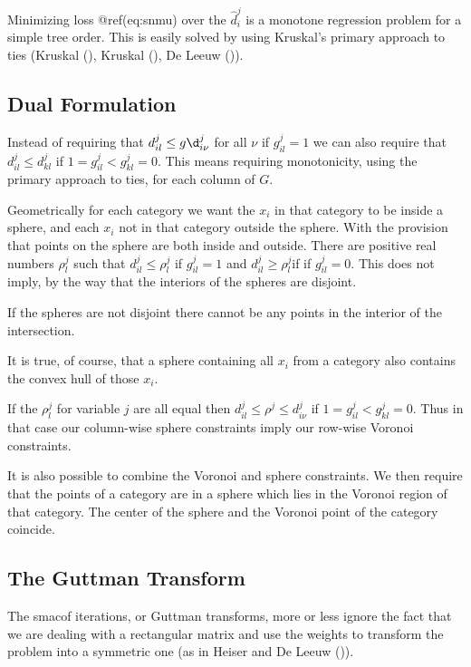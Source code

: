 \documentclass[
  12pt,
  letterpaper,
  DIV=11,
  numbers=noendperiod]{scrartcl}
\begin{document}
Minimizing loss @ref(eq:snmu) over the \(\hat d_i^j\) is a monotone
regression problem for a simple tree order. This is easily solved by
using Kruskal's primary approach to ties (Kruskal
(), Kruskal
(), De Leeuw
()).

\subsection{Dual Formulation}\label{dual-formulation}

Instead of requiring that \(d^j_{il}\leq g\d^j_{i\nu}\) for all \(\nu\)
if \(g^j_{il}=1\) we can also require that \(d^j_{il}\leq d^j_{kl}\) if
\(1=g^j_{il}<g^j_{kl}=0\). This means requiring monotonicity, using the
primary approach to ties, for each column of \(G\).

Geometrically for each category we want the \(x_i\) in that category to
be inside a sphere, and each \(x_i\) not in that category outside the
sphere. With the provision that points on the sphere are both inside and
outside. There are positive real numbers \(\rho^j_l\) such that
\(d^j_{il}\leq\rho^j_l\) if \(g^j_{il}=1\) and
\(d^j_{il}\geq\rho^j_l\)if if \(g^j_{il}=0\). This does not imply, by
the way that the interiors of the spheres are disjoint.

If the spheres are not disjoint there cannot be any points in the
interior of the intersection.

It is true, of course, that a sphere containing all \(x_i\) from a
category also contains the convex hull of those \(x_i\).

If the \(\rho^j_l\) for variable \(j\) are all equal then
\(d^j_{il}\leq\rho^j\leq d^j_{i\nu}\) if \(1=g^j_{il}<g^j_{kl}=0\). Thus
in that case our column-wise sphere constraints imply our row-wise
Voronoi constraints.

It is also possible to combine the Voronoi and sphere constraints. We
then require that the points of a category are in a sphere which lies in
the Voronoi region of that category. The center of the sphere and the
Voronoi point of the category coincide.

\subsection{The Guttman Transform}\label{the-guttman-transform}

The smacof iterations, or Guttman transforms, more or less ignore the
fact that we are dealing with a rectangular matrix and use the weights
to transform the problem into a symmetric one (as in Heiser and De Leeuw
()).
\end{document}
